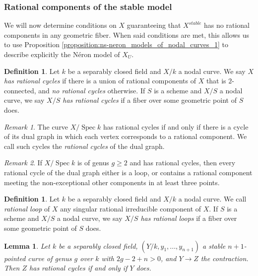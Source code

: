 \documentclass[a4paper,10pt,twoside]{article}
\newcommand{\ra}{\rightarrow}
\DeclareMathOperator{\spec}{Spec}
\newtheorem{lem}[thm]{Lemma}
\theoremstyle{definition}
\newtheorem{defi}[thm]{Definition}
\theoremstyle{remark}
\newtheorem{rem}{Remark}[thm]
\begin{document}
\subsubsection{Rational components of the stable model}

We will now determine conditions on $X$ guaranteeing that $X^{stable}$ has no rational components in any geometric fiber. When said conditions are met, this allows us to use Proposition \ref{proposition:ns-neron_models_of_nodal_curves_1} to describe explicitly the N\'eron model of $X_U$.

\begin{defi}\label{definition rational cycles}
Let $k$ be a separably closed field and $X/k$ a nodal curve. We say \emph{$X$ has rational cycles} if there is a union of rational components of $X$ that is $2$-connected, and \emph{no rational cycles} otherwise. If $S$ is a scheme and $X/S$ a nodal curve, we say \emph{$X/S$ has rational cycles} if a fiber over some geometric point of $S$ does.
\end{defi}

\begin{rem}
The curve $X/\spec k$ has rational cycles if and only if there is a cycle of its dual graph in which each vertex corresponds to a rational component. We call such cycles the \emph{rational cycles} of the dual graph.
\end{rem}

\begin{rem}\label{remark rational cycles implies rational loops or 3-point rational components}
If $X/\spec k$ is of genus $g\geq 2$ and has rational cycles, then every rational cycle of the dual graph either is a loop, or contains a rational component meeting the non-exceptional other components in at least three points.
\end{rem}

\begin{defi}\label{definition rational loops}
Let $k$ be a separably closed field and $X/k$ a nodal curve. We call \emph{rational loop} of $X$ any singular rational irreducible component of $X$. If $S$ is a scheme and $X/S$ a nodal curve, we say \emph{$X/S$ has rational loops} if a fiber over some geometric point of $S$ does.
\end{defi}

\begin{lem}
Let $k$ be a separably closed field, $(Y/k,y_1,...,y_{n+1})$ a stable $n+1$-pointed curve of genus $g$ over $k$ with $2g-2+n>0$, and $Y\ra Z$ the contraction. Then $Z$ has rational cycles if and only if $Y$ does.
\end{lem}
\end{document}
